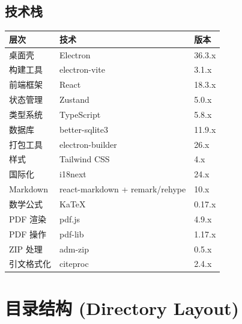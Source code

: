 \documentclass[12pt, a4paper]{article}
\begin{document}
\subsection{技术栈}

\begin{center}
\begin{tabular}{lll}
  \toprule
  \textbf{层次} & \textbf{技术} & \textbf{版本} \\
  \midrule
  桌面壳       & Electron          & 36.3.x \\
  构建工具     & electron-vite     & 3.1.x  \\
  前端框架     & React             & 18.3.x \\
  状态管理     & Zustand           & 5.0.x  \\
  类型系统     & TypeScript        & 5.8.x  \\
  数据库       & better-sqlite3    & 11.9.x \\
  打包工具     & electron-builder  & 26.x   \\
  样式         & Tailwind CSS      & 4.x    \\
  国际化       & i18next           & 24.x   \\
  Markdown     & react-markdown + remark/rehype & 10.x \\
  数学公式     & KaTeX             & 0.17.x \\
  PDF 渲染     & pdf.js            & 4.9.x  \\
  PDF 操作     & pdf-lib           & 1.17.x \\
  ZIP 处理     & adm-zip           & 0.5.x  \\
  引文格式化   & citeproc          & 2.4.x  \\
  \bottomrule
\end{tabular}
\end{center}

\section{目录结构 (Directory Layout)}
\end{document}
